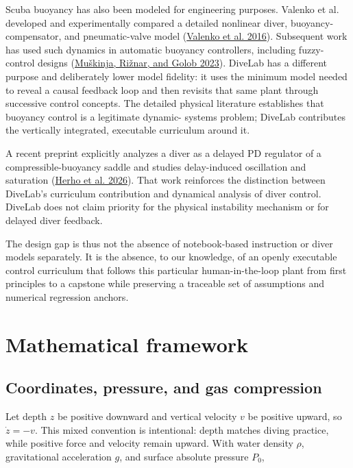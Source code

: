 \documentclass[
]{article}
\begin{document}
Scuba buoyancy has also been modeled for engineering purposes. Valenko
et al. developed and experimentally compared a detailed nonlinear diver,
buoyancy- compensator, and pneumatic-valve model
(\protect\hyperlink{ref-valenko2016}{Valenko et al. 2016}). Subsequent
work has used such dynamics in automatic buoyancy controllers, including
fuzzy-control designs (\protect\hyperlink{ref-muskinja2023}{Muškinja,
Rižnar, and Golob 2023}). DiveLab has a different purpose and
deliberately lower model fidelity: it uses the minimum model needed to
reveal a causal feedback loop and then revisits that same plant through
successive control concepts. The detailed physical literature
establishes that buoyancy control is a legitimate dynamic- systems
problem; DiveLab contributes the vertically integrated, executable
curriculum around it.

A recent preprint explicitly analyzes a diver as a delayed PD regulator
of a compressible-buoyancy saddle and studies delay-induced oscillation
and saturation (\protect\hyperlink{ref-herho2026}{Herho et al. 2026}).
That work reinforces the distinction between DiveLab's curriculum
contribution and dynamical analysis of diver control. DiveLab does not
claim priority for the physical instability mechanism or for delayed
diver feedback.

The design gap is thus not the absence of notebook-based instruction or
diver models separately. It is the absence, to our knowledge, of an
openly executable control curriculum that follows this particular
human-in-the-loop plant from first principles to a capstone while
preserving a traceable set of assumptions and numerical regression
anchors.

\hypertarget{mathematical-framework}{%
\section{Mathematical framework}\label{mathematical-framework}}

\hypertarget{coordinates-pressure-and-gas-compression}{%
\subsection{Coordinates, pressure, and gas
compression}\label{coordinates-pressure-and-gas-compression}}

Let depth \(z\) be positive downward and vertical velocity \(v\) be
positive upward, so \(\dot z=-v\). This mixed convention is intentional:
depth matches diving practice, while positive force and velocity remain
upward. With water density \(\rho\), gravitational acceleration \(g\),
and surface absolute pressure \(P_0\),
\end{document}
